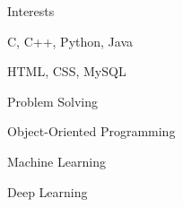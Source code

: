 \documentclass[11pt]{spidercv}
\begin{document}
    \begin{SideBar}{\ColorBackground}{\ColorTextSide}
        
        \TextSeparatorBis{\ColorHighlight} {Interests}{}
        

        \vspace*{0.4cm}
        


        \begin{ItemList}{\ColorHighlight}
            \item [\faCode] C, C++, Python, Java
            \item [\faFileCodeO]  HTML, CSS, MySQL
            \item [\faPencilSquareO]  Problem Solving
            \item [\faGear]  Object-Oriented Programming 
        \end{ItemList}
        
        \vspace*{0.4cm}
 
        \begin{ItemList}{\ColorHighlight}
            \item [] Machine Learning
            \item [] Deep Learning
        \end{ItemList}
       
        \vspace*{0.4cm}
        

        \begin{SkillGauges}{\ColorHighlight}
            

\end{SkillGauges}
\end{SideBar}
\end{document}
